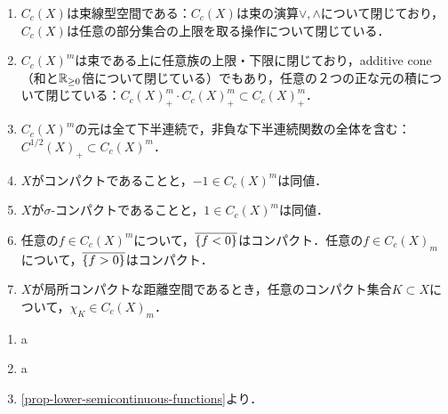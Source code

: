 \documentclass[uplatex,dvipdfmx]{jsreport}
\begin{document}
\begin{lemma}\mbox{}
    \begin{enumerate}
        \item $C_c(X)$は束線型空間である：$C_c(X)$は束の演算$\lor,\land$について閉じており，$C_c(X)$は任意の部分集合の上限を取る操作について閉じている．
        \item $C_c(X)^m$は束である上に任意族の上限・下限に閉じており，additive cone（和と$\mathbb{R}_{\ge 0}$倍について閉じている）でもあり，任意の２つの正な元の積について閉じている：$C_c(X)^m_+\cdot C_c(X)^m_+\subset C_c(X)^m_+$．
        \item $C_c(X)^m$の元は全て下半連続で，非負な下半連続関数の全体を含む：$C^{1/2}(X)_+\subset C_c(X)^m$．
        \item $X$がコンパクトであることと，$-1\in C_c(X)^m$は同値．
        \item $X$が$\sigma$-コンパクトであることと，$1\in C_c(X)^m$は同値．
        \item 任意の$f\in C_c(X)^m$について，$\overline{\left\{f<0\right\}}$はコンパクト．任意の$f\in C_c(X)_m$について，$\overline{\left\{f>0\right\}}$はコンパクト．
        \item $X$が局所コンパクトな距離空間であるとき，任意のコンパクト集合$K\subset X$について，$\chi_K\in C_c(X)_m$．
    \end{enumerate}
\end{lemma}
\begin{Proof}\mbox{}
    \begin{enumerate}
        \item a
        \item a
        \item \ref{prop-lower-semicontinuous-functions}より．
    \end{enumerate}
\end{Proof}
\end{document}
